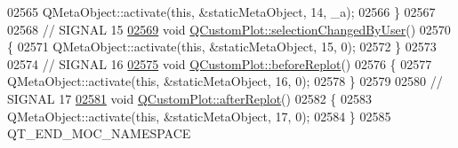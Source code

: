 \begin{DoxyCode}
02565     QMetaObject::activate(\textcolor{keyword}{this}, &staticMetaObject, 14, \_a);
02566 \}
02567 
02568 \textcolor{comment}{// SIGNAL 15}
\hypertarget{a00067_source_l02569}{}\hyperlink{a00116_a500c64a109bc773c973ad274f2fa4190}{02569} \textcolor{keywordtype}{void} \hyperlink{a00116_a500c64a109bc773c973ad274f2fa4190}{QCustomPlot::selectionChangedByUser}()
02570 \{
02571     QMetaObject::activate(\textcolor{keyword}{this}, &staticMetaObject, 15, 0);
02572 \}
02573 
02574 \textcolor{comment}{// SIGNAL 16}
\hypertarget{a00067_source_l02575}{}\hyperlink{a00116_a0cd30e29b73efd6afe096e44bc5956f5}{02575} \textcolor{keywordtype}{void} \hyperlink{a00116_a0cd30e29b73efd6afe096e44bc5956f5}{QCustomPlot::beforeReplot}()
02576 \{
02577     QMetaObject::activate(\textcolor{keyword}{this}, &staticMetaObject, 16, 0);
02578 \}
02579 
02580 \textcolor{comment}{// SIGNAL 17}
\hypertarget{a00067_source_l02581}{}\hyperlink{a00116_a6f4fa624af060bc5919c5f266cf426a0}{02581} \textcolor{keywordtype}{void} \hyperlink{a00116_a6f4fa624af060bc5919c5f266cf426a0}{QCustomPlot::afterReplot}()
02582 \{
02583     QMetaObject::activate(\textcolor{keyword}{this}, &staticMetaObject, 17, 0);
02584 \}
02585 QT\_END\_MOC\_NAMESPACE
\end{DoxyCode}
